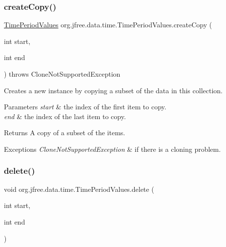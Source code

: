 \subsubsection{\texorpdfstring{create\+Copy()}{createCopy()}}
{\footnotesize\ttfamily \mbox{\hyperlink{classorg_1_1jfree_1_1data_1_1time_1_1_time_period_values}{Time\+Period\+Values}} org.\+jfree.\+data.\+time.\+Time\+Period\+Values.\+create\+Copy (\begin{DoxyParamCaption}\item[{int}]{start,  }\item[{int}]{end }\end{DoxyParamCaption}) throws Clone\+Not\+Supported\+Exception}

Creates a new instance by copying a subset of the data in this collection.


\begin{DoxyParams}{Parameters}
{\em start} & the index of the first item to copy. \\
\hline
{\em end} & the index of the last item to copy.\\
\hline
\end{DoxyParams}
\begin{DoxyReturn}{Returns}
A copy of a subset of the items.
\end{DoxyReturn}

\begin{DoxyExceptions}{Exceptions}
{\em Clone\+Not\+Supported\+Exception} & if there is a cloning problem. \\
\hline
\end{DoxyExceptions}
\mbox{\label{classorg_1_1jfree_1_1data_1_1time_1_1_time_period_values_a5a54b76ab3c0a09c6744afadf13b9e2e}} 
\subsubsection{\texorpdfstring{delete()}{delete()}}
{\footnotesize\ttfamily void org.\+jfree.\+data.\+time.\+Time\+Period\+Values.\+delete (\begin{DoxyParamCaption}\item[{int}]{start,  }\item[{int}]{end }\end{DoxyParamCaption})}

